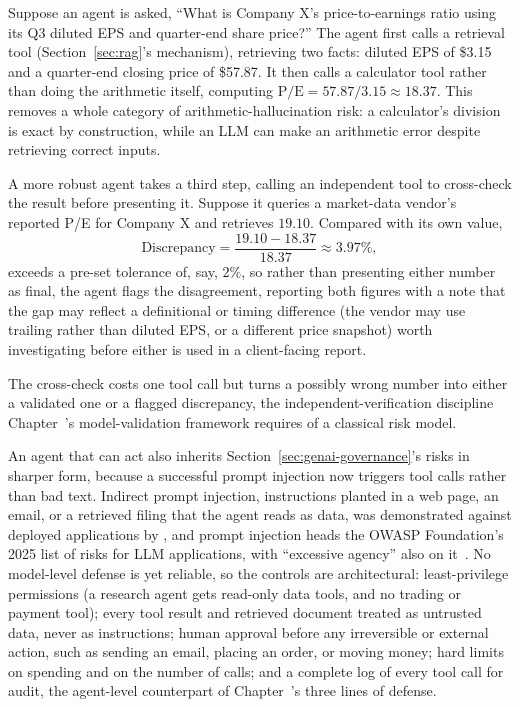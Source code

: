 \documentclass[../ai_in_finance]{subfiles}
\begin{document}
Suppose an agent is asked, ``What is Company X's price-to-earnings ratio using its Q3 diluted EPS and quarter-end share price?'' The agent first calls a retrieval tool (Section~\ref{sec:rag}'s mechanism), retrieving two facts: diluted EPS of \$3.15 and a quarter-end closing price of \$57.87. It then calls a calculator tool rather than doing the arithmetic itself, computing $\text{P/E} = 57.87 / 3.15 \approx 18.37$. This removes a whole category of arithmetic-hallucination risk: a calculator's division is exact by construction, while an LLM can make an arithmetic error despite retrieving correct inputs.

A more robust agent takes a third step, calling an independent tool to cross-check the result before presenting it. Suppose it queries a market-data vendor's reported P/E for Company X and retrieves $19.10$. Compared with its own value,
\begin{equation*}
\text{Discrepancy} = \frac{19.10 - 18.37}{18.37} \approx 3.97\%,
\end{equation*}
exceeds a pre-set tolerance of, say, $2\%$, so rather than presenting either number as final, the agent flags the disagreement, reporting both figures with a note that the gap may reflect a definitional or timing difference (the vendor may use trailing rather than diluted EPS, or a different price snapshot) worth investigating before either is used in a client-facing report.

The cross-check costs one tool call but turns a possibly wrong number into either a validated one or a flagged discrepancy, the independent-verification discipline Chapter~'s model-validation framework requires of a classical risk model.

An agent that can act also inherits Section~\ref{sec:genai-governance}'s risks in sharper form, because a successful prompt injection now triggers tool calls rather than bad text. Indirect prompt injection, instructions planted in a web page, an email, or a retrieved filing that the agent reads as data, was demonstrated against deployed applications by \textcite{greshake2023not}, and prompt injection heads the OWASP Foundation's 2025 list of risks for LLM applications, with ``excessive agency'' also on it~\parencite{owasp2025llm}. No model-level defense is yet reliable, so the controls are architectural: least-privilege permissions (a research agent gets read-only data tools, and no trading or payment tool); every tool result and retrieved document treated as untrusted data, never as instructions; human approval before any irreversible or external action, such as sending an email, placing an order, or moving money; hard limits on spending and on the number of calls; and a complete log of every tool call for audit, the agent-level counterpart of Chapter~'s three lines of defense.
\end{document}
